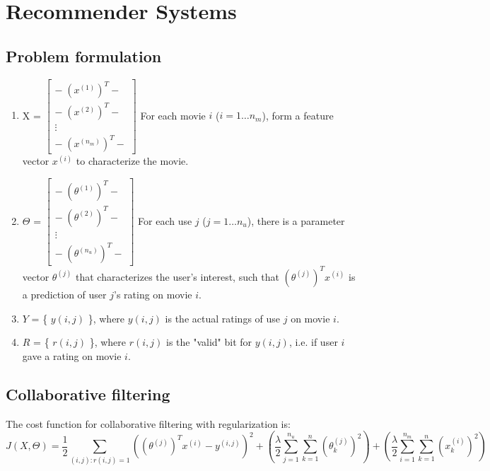 \section{Recommender Systems}
    \subsection{Problem formulation}
        \begin{enumerate}
            \item X = $\left\lbrack 
                \begin{array}{c}
                    -{\;\left(x^{\left(1\right)} \right)}^T -\\
                    -{\;\left(x^{\left(2\right)} \right)}^T -\\
                    \vdots \\
                    -{\;\left(x^{\left(n_m \right)} \right)}^T -
                \end{array}
                \right\rbrack$  For each movie $i$ ($i = 1 \dots n_m$), form a feature vector $x^{(i)}$ to characterize the movie. 
            \item $\Theta$ = $\left\lbrack 
                \begin{array}{c}
                    -{\;\left(\theta^{\left(1\right)} \right)}^T -\\
                    -{\;\left(\theta^{\left(2\right)} \right)}^T -\\
                    \vdots \\
                    -{\;\left(\theta^{\left(n_u \right)} \right)}^T -
                \end{array}
                \right\rbrack$ For each use $j$ ($j = 1 \dots n_u$), there is a parameter vector $\theta^{(j)}$ that characterizes the user's interest, such that $(\theta^{(j)})^T x^{(i)}$ is a prediction of user $j$'s rating on movie $i$. 
            \item $Y$ = \{ $y(i,j)$ \}, where $y(i,j)$ is the actual ratings of use $j$ on movie $i$.
            \item $R$ = \{ $r(i,j)$ \}, where $r(i,j)$ is the "valid" bit for $y(i,j)$, i.e. if user $i$ gave a rating on movie $i$.
        \end{enumerate}
    \subsection{Collaborative filtering}
    The cost function for collaborative filtering with regularization is: 
        \begin{equation}
            J(X, \Theta)=
\frac{1}{2}\sum_{(i,j):r(i,j)=1}\left((\theta^{(j)})^Tx^{(i)}-y^{(i,j)}\right)^2+\left(\frac{\lambda}{2}\sum_{j=1}^{n_u}{\sum_{k=1}^{n}{(\theta_k^{(j)})^2}}\right)+\left(\frac{\lambda}{2}\sum_{i=1}^{n_m}{\sum_{k=1}^{n}{(x_k^{(i)})^2}}\right)
            \label{eq:collab-filter-reg}
        \end{equation}

